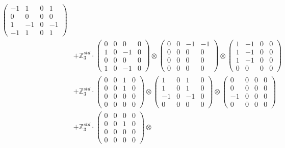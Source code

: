 \documentclass{article}
\begin{document}
{\begin{align}
            \begin{pmatrix} -1 & 1 & 0 & 1 \\ 0 & 0 & 0 & 0 \\ 1 & -1 & 0 & -1 \\ -1 & 1 & 0 & 1 \end{pmatrix} \\ 
        &+ \label{Rs16-Rc11-Solution-12-c25} \mathbb{Z}_3^{std} \cdot 
            \begin{pmatrix} 0 & 0 & 0 & 0 \\ 1 & 0 & -1 & 0 \\ 0 & 0 & 0 & 0 \\ 1 & 0 & -1 & 0 \end{pmatrix} \otimes 
            \begin{pmatrix} 0 & 0 & -1 & -1 \\ 0 & 0 & 0 & 0 \\ 0 & 0 & 0 & 0 \\ 0 & 0 & 0 & 0 \end{pmatrix} \otimes 
            \begin{pmatrix} 1 & -1 & 0 & 0 \\ 1 & -1 & 0 & 0 \\ 1 & -1 & 0 & 0 \\ 0 & 0 & 0 & 0 \end{pmatrix} \\ 
        &+ \label{Rs16-Rc11-Solution-12-c26} \mathbb{Z}_3^{std} \cdot 
            \begin{pmatrix} 0 & 0 & 1 & 0 \\ 0 & 0 & 1 & 0 \\ 0 & 0 & 0 & 0 \\ 0 & 0 & 0 & 0 \end{pmatrix} \otimes 
            \begin{pmatrix} 1 & 0 & 1 & 0 \\ 1 & 0 & 1 & 0 \\ -1 & 0 & -1 & 0 \\ 0 & 0 & 0 & 0 \end{pmatrix} \otimes 
            \begin{pmatrix} 0 & 0 & 0 & 0 \\ 0 & 0 & 0 & 0 \\ -1 & 0 & 0 & 0 \\ 0 & 0 & 0 & 0 \end{pmatrix} \\ 
        &+ \label{Rs16-Rc11-Solution-12-c27} \mathbb{Z}_3^{std} \cdot 
            \begin{pmatrix} 0 & 0 & 0 & 0 \\ 0 & 0 & 1 & 0 \\ 0 & 0 & 0 & 0 \\ 0 & 0 & 0 & 0 \end{pmatrix} \otimes 

\end{align}}
\end{document}
